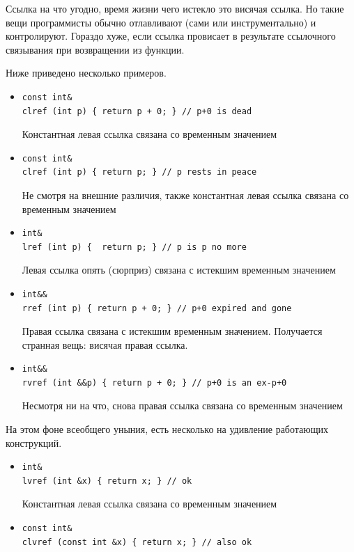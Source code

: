 \documentclass[a4paper,12pt,oneside]{book}
\begin{document}
Ссылка на что угодно, время жизни чего истекло это висячая ссылка. Но такие вещи программисты обычно отлавливают (сами или инструментально) и контролируют. Гораздо хуже, если ссылка провисает в результате ссылочного связывания при возвращении из функции.

Ниже приведено несколько примеров.

\begin{itemize}
\item
\begin{lstlisting}
const int& 
clref (int p) { return p + 0; } // p+0 is dead
\end{lstlisting}
Константная левая ссылка связана со временным значением
\item
\begin{lstlisting}
const int& 
clref (int p) { return p; } // p rests in peace 
\end{lstlisting}
Не смотря на внешние различия, также константная левая ссылка связана со временным значением
\item
\begin{lstlisting}
int& 
lref (int p) {  return p; } // p is p no more
\end{lstlisting}
Левая ссылка опять (сюрприз) связана с истекшим временным значением
\item
\begin{lstlisting}
int&& 
rref (int p) { return p + 0; } // p+0 expired and gone 
\end{lstlisting}
Правая ссылка связана с истекшим временным значением. Получается странная вещь: висячая правая ссылка.
\item
\begin{lstlisting}
int&& 
rvref (int &&p) { return p + 0; } // p+0 is an ex-p+0
\end{lstlisting}
Несмотря ни на что, снова правая ссылка связана со временным значением
\end{itemize}

На этом фоне всеобщего уныния, есть несколько на удивление работающих конструкций. 

\begin{itemize}
\item
\begin{lstlisting}
int& 
lvref (int &x) { return x; } // ok
\end{lstlisting}
Константная левая ссылка связана со временным значением
\item
\begin{lstlisting}
const int& 
clvref (const int &x) { return x; } // also ok
\end{lstlisting}
\end{itemize}
\end{document}
